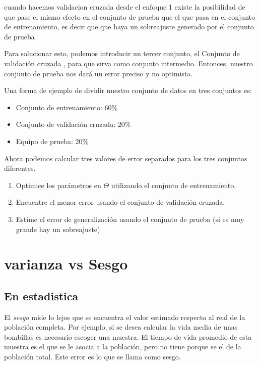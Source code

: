 \documentclass[
]{article}
\providecommand{\tightlist}{%
  \setlength{\itemsep}{0pt}\setlength{\parskip}{0pt}}
\begin{document}
cuando hacemos validacion cruzada desde el enfoque 1 existe la
posibilidad de que pase el mismo efecto en el conjunto de prueba que el
que pasa en el conjunto de entrenamiento, es decir que que haya un
sobreajuste generado por el conjunto de prueba

Para solucionar esto, podemos introducir un tercer conjunto, el Conjunto
de validación cruzada , para que sirva como conjunto intermedio.
Entonces, nuestro conjunto de prueba nos dará un error preciso y no
optimista.

Una forma de ejemplo de dividir nuestro conjunto de datos en tres
conjuntos es:

\begin{itemize}
\tightlist
\item
  Conjunto de entrenamiento: 60\%
\item
  Conjunto de validación cruzada: 20\%
\item
  Equipo de prueba: 20\%
\end{itemize}

Ahora podemos calcular tres valores de error separados para los tres
conjuntos diferentes.

\begin{enumerate}
\def\labelenumi{\arabic{enumi}.}
\tightlist
\item
  Optimice los parámetros en \(\Theta\) utilizando el conjunto de
  entrenamiento.
\item
  Encuentre el menor error usando el conjunto de validación cruzada.
\item
  Estime el error de generalización usando el conjunto de prueba (si es
  muy grande hay un sobreajuste)
\end{enumerate}

\hypertarget{varianza-vs-sesgo}{%
\section{varianza vs Sesgo}\label{varianza-vs-sesgo}}

\hypertarget{en-estadistica}{%
\subsection{En estadistica}\label{en-estadistica}}

El \emph{sesgo} mide lo lejos que se encuentra el valor estimado
respecto al real de la población completa. Por ejemplo, si se desea
calcular la vida media de unas bombillas es necesario escoger una
muestra. El tiempo de vida promedio de esta muestra es el que se le
asocia a la población, pero no tiene porque se el de la población total.
Este error es lo que se llama como sesgo.
\end{document}
